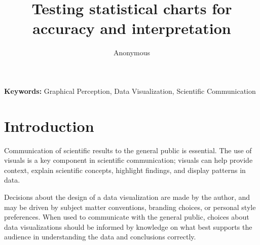 \documentclass[10pt]{article}\usepackage[]{graphicx}\usepackage[table]{xcolor}
\title{Testing statistical charts for accuracy and interpretation}
\author{Anonymous}
\begin{document}
\titlespacing{\subsection}{0pt}{1ex}{0ex}
\titlespacing{\section}{0pt}{1ex}{0ex}


\maketitle

{\bf Keywords:} Graphical Perception, Data Visualization, Scientific Communication

\section{Introduction}

Communication of scientific results to the general public is essential. The use of visuals is a key component in scientific communication; visuals can help provide context, explain scientific concepts, highlight findings, and display patterns in data. 

Decisions about the design of a data visualization are made by the author, and may be driven by subject matter conventions, branding choices, or personal style preferences. When used to communicate with the general public, choices about data visualizations should be informed by knowledge on what best supports the audience in understanding the data and conclusions correctly. %
\end{document}
